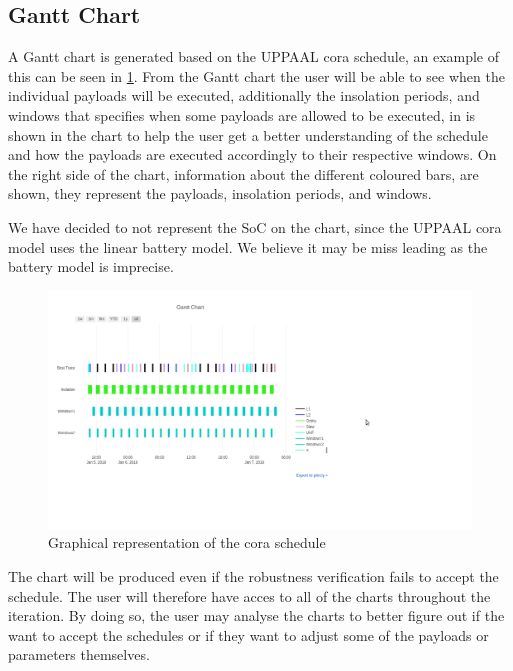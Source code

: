 \subsection{Gantt Chart} \label{subsec:gantt}
A Gantt chart is generated based on the UPPAAL \gls{cora} schedule, an example of this can be seen in \cref{fig:gantt}. From the Gantt chart the user will be able to see when the individual payloads will be executed, additionally the insolation periods, and windows that specifies when some payloads are allowed to be executed, in is shown in the chart to help the user get a better understanding of the schedule and how the payloads are executed accordingly to their respective windows. On the right side of the chart, information about the different coloured bars, are shown, they represent the payloads, insolation periods, and windows. 

We have decided to not represent the SoC on the chart, since the UPPAAL \gls{cora} model uses the linear battery model. We believe it may be miss leading as the battery model is imprecise.

\begin{figure}[!h]
	\includegraphics[width=\textwidth]{graphics/gantt.png}
	\caption{Graphical representation of the \gls{cora} schedule}
	\label{fig:gantt}
\end{figure}
The chart will be produced even if the robustness verification fails to accept the schedule. The user will therefore have acces to all of the charts throughout the iteration. By doing so, the user may analyse the charts to better figure out if the want to accept the schedules or if they want to adjust some of the payloads or parameters themselves.
